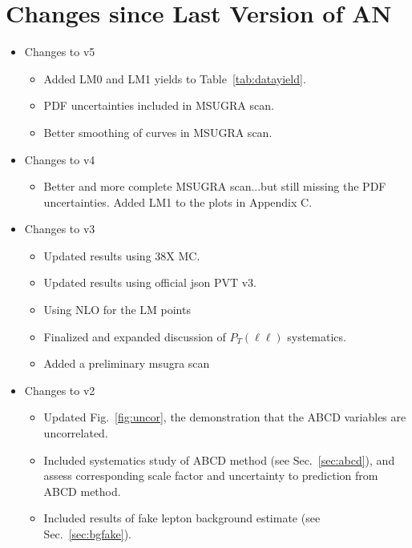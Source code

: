 \section{Changes since Last Version of AN}
\label{sec:changes}



\begin{itemize}
\item Changes to v5
\begin{itemize}
\item Added LM0 and LM1 yields to Table~\ref{tab:datayield}.
\item PDF uncertainties included in MSUGRA scan.
\item Better smoothing of curves in MSUGRA scan.
\end{itemize}
\item Changes to v4
\begin{itemize}
\item Better and more complete MSUGRA scan...but still missing
the PDF uncertainties.  Added LM1 to the plots in Appendix C.
\end{itemize}
\item Changes to v3
\begin{itemize}
\item Updated results using 38X MC.
\item Updated results using official json PVT v3.
\item Using NLO for the LM points
\item Finalized and expanded discussion of $P_T(\ell \ell)$ systematics.
\item Added a preliminary msugra scan
\end{itemize}

\item Changes to v2
\begin{itemize}
\item Updated Fig.~\ref{fig:uncor}, the demonstration that the ABCD variables are uncorrelated. 
\item Included systematics study of ABCD method (see Sec.~\ref{sec:abcd}), and assess corresponding scale factor
and uncertainty to prediction from ABCD method.
\item Included results of fake lepton background estimate (see Sec.~\ref{sec:bgfake}).
\end{itemize}
\end{itemize}
